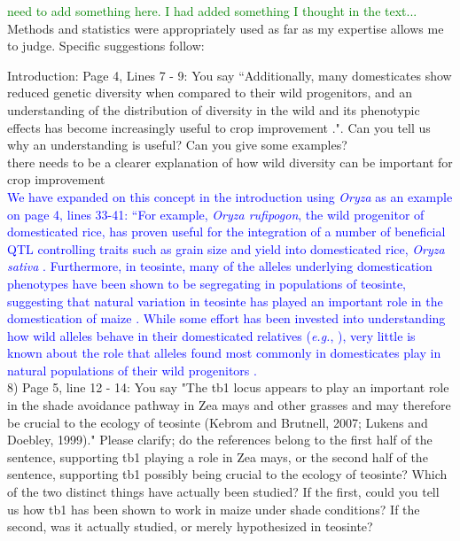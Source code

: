 \documentclass[11pt]{article}
\newcommand{\res}[1]{\noindent \textcolor{blue}{{#1}} \\}
\newcommand{\lev}[1]{\noindent \textcolor{green}{{#1}} \\}
\newcommand{\mbh}[1]{\noindent \textcolor{Dandelion}{{#1}}\\}
\begin{document}
\lev{need to add something here. I had added something I thought in the text...}

Methods and statistics were appropriately used as far as my expertise allows me to judge.
Specific suggestions follow:

Introduction:
Page 4, Lines 7 - 9: You say ``Additionally, many domesticates show reduced genetic diversity when compared to their wild progenitors, and an understanding of the distribution of diversity in the wild and its phenotypic effects has become increasingly useful to crop improvement \citep{KovachMcCouch2008}.".  Can you tell us why an understanding is useful? Can you give some examples?\\

\mbh{there needs to be a clearer explanation of how wild diversity can be important for crop improvement}

\res{We have expanded on this concept in the introduction using \emph{Oryza} as an example on page 4, lines 33-41: ``For example, \emph{Oryza rufipogon}, the wild progenitor of domesticated rice, has proven useful for the integration of a number of beneficial QTL controlling traits such as grain size and yield into domesticated rice, \emph{Oryza sativa} \citep{KovachMcCouch2008}. Furthermore, in teosinte, many of the alleles underlying domestication phenotypes have been shown to be segregating in populations of teosinte, suggesting that natural variation in teosinte has played an important role in the domestication of maize \citep{Gallavotti2004, SigmonVollbrecht2010}. While some effort has been invested into understanding how wild alleles behave in their domesticated relatives (\emph{e.g.}, \citealt{Bai2007}), very little is known about the role that alleles found most commonly in domesticates play in natural populations of their wild progenitors \citep{Whitton1997}.}

8) Page 5, line 12 - 14: You say "The tb1 locus appears to play an important role in the shade avoidance pathway in Zea mays and other grasses and may therefore be crucial to the ecology of teosinte (Kebrom and Brutnell, 2007; Lukens and Doebley, 1999)." Please clarify; do the references belong to the first half of the sentence, supporting tb1 playing a role in Zea mays, or the second half of the sentence, supporting tb1 possibly being crucial to the ecology of teosinte? Which of the two distinct things have actually been studied? If the first, could you tell us how tb1 has been shown to work in maize under shade conditions? If the second, was it actually studied, or merely hypothesized in teosinte?\\ 
\end{document}
